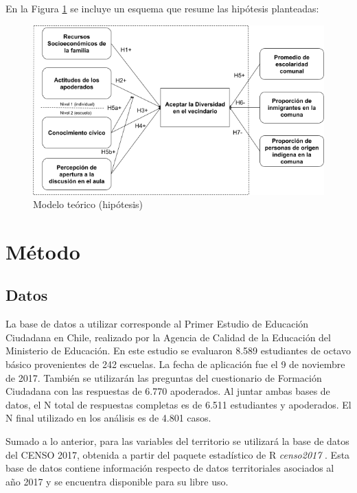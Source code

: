 \documentclass[12pt,twoside]{templates/facsothesis}
\begin{document}
En la Figura \ref{fig:hipotesis} se incluye un esquema que resume las hipótesis planteadas:

\begin{figure}[!ht]

{\centering \includegraphics[width=1\linewidth,]{images/modelo_original} 

}

\caption{Modelo teórico (hipótesis)}\label{fig:hipotesis}
\end{figure}

\hypertarget{muxe9todo}{%
\chapter{Método}\label{muxe9todo}}

\hypertarget{datos}{%
\section{Datos}\label{datos}}

La base de datos a utilizar corresponde al Primer Estudio de Educación Ciudadana en Chile, realizado por la Agencia de Calidad de la Educación del Ministerio de Educación. En este estudio se evaluaron 8.589 estudiantes de octavo básico provenientes de 242 escuelas. La fecha de aplicación fue el 9 de noviembre de 2017. También se utilizarán las preguntas del cuestionario de Formación Ciudadana con las respuestas de 6.770 apoderados. Al juntar ambas bases de datos, el N total de respuestas completas es de 6.511 estudiantes y apoderados. El N final utilizado en los análisis es de 4.801 casos.

Sumado a lo anterior, para las variables del territorio se utilizará la base de datos del CENSO 2017, obtenida a partir del paquete estadístico de R \emph{censo2017} \citep{vargas_censo2017_2022}. Esta base de datos contiene información respecto de datos territoriales asociados al año 2017 y se encuentra disponible para su libre uso.
\end{document}
